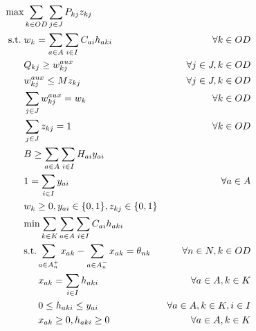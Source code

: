 \documentclass{article}
\newcommand{\modelspace}{\hspace{1.5em}}
\begin{document}
  \begin{align}
    \text{max}    & \sum_{k \in OD} \sum_{j \in J} P_{kj} z_{kj}                                     & \label{eq:objective1lvlfinal} \\
    \text{s.t.}\; & w_k = \sum_{a \in A} \sum_{i \in I} C_{ai}h_{aki}                                & \forall k \in OD \label{eq:shortestpathfinal} \\
                  & Q_{kj} \geq w^{aux}_{kj}                                                         & \forall j \in J, k \in OD \label{eq:breakpoints} \\
                  & w^{aux}_{kj} \leq M z_{kj}                                                       & \forall j \in J, k \in OD \\
                  & \sum_{j \in J} w^{aux}_{kj} = w_k                                                & \forall k \in OD \\
                  & \sum_{j \in J} z_{kj} = 1                                                        & \forall k \in OD \label{eq:singularbreakpoint} \\
                  & B \geq \sum_{a \in A} \sum_{i \in I} H_{ai}y_{ai}                                & \label{eq:respectbudgetfinal} \\
                  & 1 = \sum_{i \in I} y_{ai}                                                        & \forall a \in A \label{eq:alwaysoneyfinal} \\
                  & w_k \geq 0, y_{ai} \in \{0,1\}, z_{kj} \in \{0,1\}                               & \nonumber \\
                  & \text{min} \sum_{k \in K} \sum_{a \in A} \sum_{i \in I} C_{ai} h_{aki}           & \label{eq:subproblemfinal} \\
                  & \text{s.t.} \sum_{a \in A_n^+} x_{ak} - \sum_{a \in A_n^-} x_{ak} = \theta_{nk}  & \forall n \in N, k \in OD \label{eq:flowbalancefinal} \\
                  & \modelspace x_{ak} = \sum_{i \in I} h_{aki}                                      & \forall a \in A, k \in K \label{eq:flowactivation} \\
                  & \modelspace 0 \leq h_{aki} \leq y_{ai}                                           & \forall a \in A, k \in K, i \in I \label{eq:respectinfra} \\
                  & \modelspace x_{ak} \geq 0, h_{aki} \geq 0                                        & \forall a \in A, k \in K \nonumber
  \end{align}
\end{document}

